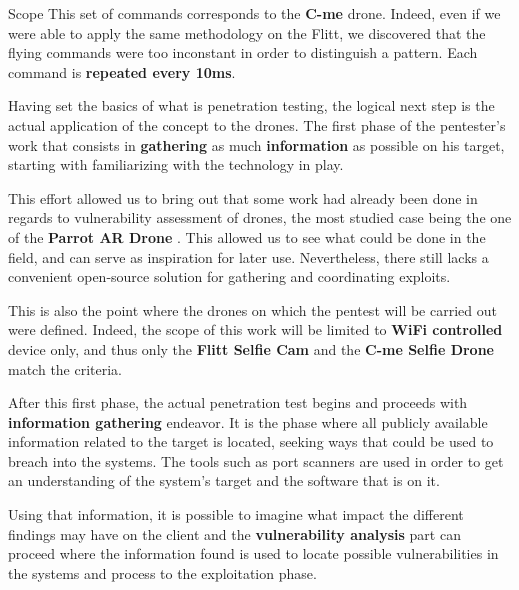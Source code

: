 \begin{chaptercover}{Scope}
This set of commands corresponds to the \textbf{C-me} drone. Indeed, even if we were able to apply the same methodology on the Flitt, we discovered that the flying commands were too inconstant in order to distinguish a pattern. Each command is \textbf{repeated every 10ms}.

\begin{summary}
Having set the basics of what is penetration testing, the logical next step is the actual application of the concept to the drones. The first phase of the pentester’s work that consists in \textbf{gathering} as much \textbf{information} as possible on his target, starting with familiarizing with the technology in play.

This effort allowed us to bring out that some work had already been done in regards to vulnerability assessment of drones, the most studied case being the one of the \textbf{Parrot AR Drone} \cite{github-drone-hacking} \cite{hacking-securing-ardrone2}. This allowed us to see what could be done in the field, and can serve as inspiration for later use. Nevertheless, there still lacks a convenient open-source solution for gathering and coordinating exploits.

This is also the point where the drones on which the pentest will be carried out were defined. Indeed, the scope of this work will be limited to \textbf{WiFi controlled} device only, and thus only the \textbf{Flitt Selfie Cam} and the \textbf{C-me Selfie Drone} match the criteria.

After this first phase, the actual penetration test begins and proceeds with \textbf{information gathering} endeavor. It is the phase where all publicly available information related to the target is located, seeking ways that could be used to breach into the systems. The tools such as port scanners are used in order to get an understanding of the system’s target and the software that is on it.

Using that information, it is possible to imagine what impact the different findings may have on the client and the \textbf{vulnerability analysis} part can proceed where the information found is used to locate possible vulnerabilities in the systems and process to the exploitation phase.


\end{summary}
\end{chaptercover}
